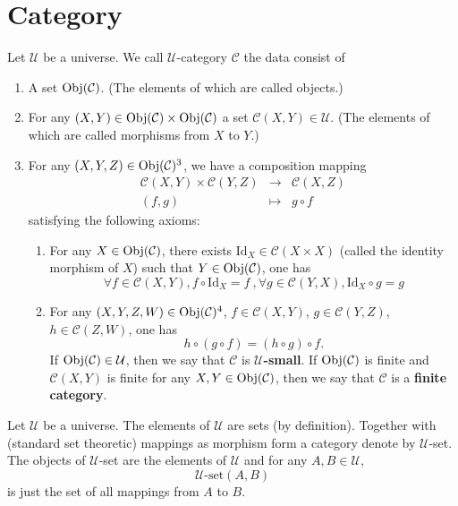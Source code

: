 \section{Category}
\begin{definitionenv}
    Let $\mathcal{U}$ be a universe. We call $\mathcal{U}$-category $\mathcal{C}$ the data consist of
    \begin{enumerate}[label=(\roman*)]
        \item A set $\mathrm{Obj}(\mathcal{C})$. (The elements of which are called objects.)
        \item For any $(X,Y) \in \mathrm{Obj}(\mathcal{C})\times \mathrm{Obj}(\mathcal{C})$ a set $\mathcal{C}(X,Y)\in \mathcal{U}$. (The elements of which are called morphisms from $X$ to $Y$.)
        \item For any $(X,Y,Z)\in \mathrm{Obj}(\mathcal{C})^3$, we have a composition mapping
$$
            \begin{array}{rcl}
            \mathcal{C}(X,Y)\times \mathcal{C}(Y,Z) &\rightarrow &\mathcal{C}(X,Z)\\ 
            (f,g)&\mapsto & g\circ f
            \end{array}
$$
            satisfying the following axioms:
            \begin{enumerate}[label=(\alph*)]
                \item For any $X\in \mathrm{Obj}(\mathcal{C})$, there exists $\mathrm{Id}_X\in \mathcal{C}(X\times X)$ (called the identity morphism of $X$) such that $Y\in \mathrm{Obj}(\mathcal{C})$, one has
                $$\forall f\in \mathcal{C}(X,Y), f\circ \mathrm{Id}_X = f\ ,\forall g\in \mathcal{C}(Y,X), \mathrm{Id}_X\circ g = g$$
                \item For any $(X,Y,Z,W)\in \mathrm{Obj}(\mathcal{C})^4$, $f\in \mathcal{C}(X,Y)$, $g\in \mathcal{C}(Y,Z)$, $h\in \mathcal{C}(Z,W)$, one has $$ h\circ(g\circ f) = (h\circ g)\circ f.$$
                    If $\mathrm{Obj}(\mathcal{C})\in \mathcal{U}$, then we say that $\mathcal{C}$ is \textbf{$\mathcal{U}$-small}. If $\mathrm{Obj}(\mathcal{C})$ is finite and $\mathcal{C}(X,Y)$ is finite for any $X,Y\in \mathrm{Obj}(\mathcal{C})$, then we say that $\mathcal{C}$ is a \textbf{finite category}.
            \end{enumerate}
    \end{enumerate}
\end{definitionenv}
\begin{exampleenv}
    Let $\mathcal{U}$ be a universe. The elements of $\mathcal{U}$ are sets (by definition). Together with (standard set theoretic) mappings as morphism form a category denote by $\mathcal{U}$-set. The objects of $\mathcal{U}$-set are the elements of $\mathcal{U}$ and for any $A,B\in \mathcal{U}$, 
    $$ \mathcal{U}\text{-}\mathrm{set}(A,B)$$
    is just the set of all mappings from $A$ to $B$.
\end{exampleenv}
